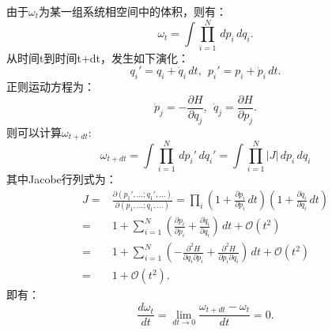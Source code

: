 \documentclass[reqno,a4paper,12pt]{amsart}
\begin{document}
\begin{tcolorbox}[breakable, colback = black!5!white, colframe = black]
由于$\omega_t$为某一组系统相空间中的体积，则有：
\[
	\omega_t = \int \prod_{i=1}^N \,dp_i\,dq_i.
\]
从时间t到时间t+dt，发生如下演化：
\[
	q_i' = q_i + \dot{q}_i\,dt, ~~ p_i' = p_i + \dot{p}_i\,dt.
\]
正则运动方程为：
\[
	\dot{p}_j = -\frac{\partial H}{\partial q_j}, ~~ \dot{q}_j = \frac{\partial H}{\partial p_j}.
\]
则可以计算$\omega_{t+dt}$:
\[
	\omega_{t+dt} = \int \prod_{i=1}^N \,dp_i'\,dq_i' = \int \prod_{i=1}^N \vert J \vert \,dp_i\,dq_i
\]
其中Jacobe行列式为：
\begin{align*}
	J =& \frac{\partial (p_1', \dots; q_1', \dots)}{\partial (p_1, \dots; q_1, \dots)} = \prod_{i} \left( 1+\frac{\partial \dot{p}_i}{\partial p_i}\,dt \right) \left( 1+\frac{\partial \dot{q}_i}{\partial q_i}\,dt \right) \\ 
	=& 1 + \sum_{i=1}^N \left( \frac{\partial \dot{p}_i}{\partial p_i} + \frac{\partial \dot{q}_i}{\partial q_i} \right)\,dt + \mathcal{O}(t^2) \\
	=& 1 + \sum_{i=1}^N \left( -\frac{\partial^2 H}{\partial q_i \partial p_i} + \frac{\partial^2 H}{\partial p_i \partial q_i} \right) \,dt + \mathcal{O}(t^2) \\
	=& 1 + \mathcal{O}(t^2).
\end{align*}
即有：
\[
	\frac{d\omega_t}{dt} = \lim_{dt\to 0} \frac{\omega_{t+dt} - \omega_t}{dt} = 0.
\]
\end{tcolorbox}
\end{document}
